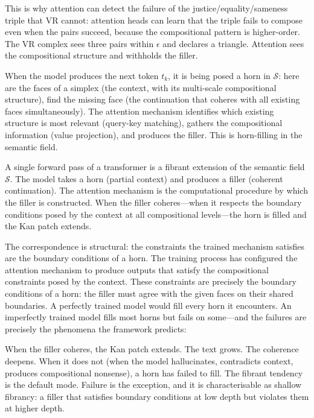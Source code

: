This is why attention can detect the failure of the justice/equality/sameness triple that VR cannot: attention heads can learn that the triple fails to compose even when the pairs succeed, because the compositional pattern is higher-order. The VR complex sees three pairs within $\epsilon$ and declares a triangle. Attention sees the compositional structure and withholds the filler.

When the model produces the next token $t_k$, it is being posed a horn in $\mathcal{S}$: here are the faces of a simplex (the context, with its multi-scale compositional structure), find the missing face (the continuation that coheres with all existing faces simultaneously). The attention mechanism identifies which existing structure is most relevant (query-key matching), gathers the compositional information (value projection), and produces the filler. This is horn-filling in the semantic field.

\begin{principle}
\label{princ:attention}
A single forward pass of a transformer is a fibrant extension of the semantic field $\mathcal{S}$. The model takes a horn (partial context) and produces a filler (coherent continuation). The attention mechanism is the computational procedure by which the filler is constructed. When the filler coheres---when it respects the boundary conditions posed by the context at all compositional levels---the horn is filled and the Kan patch extends.
\end{principle}

The correspondence is structural: the constraints the trained mechanism satisfies are the boundary conditions of a horn. The training process has configured the attention mechanism to produce outputs that satisfy the compositional constraints posed by the context. These constraints are precisely the boundary conditions of a horn: the filler must agree with the given faces on their shared boundaries. A perfectly trained model would fill every horn it encounters. An imperfectly trained model fills most horns but fails on some---and the failures are precisely the phenomena the framework predicts:

When the filler coheres, the Kan patch extends. The text grows. The coherence deepens. When it does not (when the model hallucinates, contradicts context, produces compositional nonsense), a horn has failed to fill. The fibrant tendency is the default mode. Failure is the exception, and it is characterisable as shallow fibrancy: a filler that satisfies boundary conditions at low depth but violates them at higher depth.


